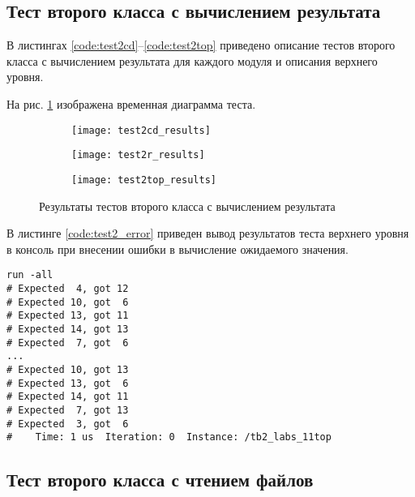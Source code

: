 \subsection{Тест второго класса с вычислением результата}

В листингах \ref{code:test2cd}--\ref{code:test2top} приведено описание тестов второго класса с вычислением результата для каждого модуля и описания верхнего уровня.




На рис. \ref{fig:test2_results} изображена временная диаграмма теста.
\begin{figure}[H]
	\begin{subfigure}{\textwidth}
		\centering
		\texttt{[image: test2cd\_results]}
		\vspace{0.1cm}
	\end{subfigure}
	\begin{subfigure}{\textwidth}
		\centering
		\texttt{[image: test2r\_results]}
		\vspace{0.1cm}
	\end{subfigure}
	\begin{subfigure}{\textwidth}
		\centering
		\texttt{[image: test2top\_results]}
	\end{subfigure}
	\caption{Результаты тестов второго класса с вычислением результата}
	\label{fig:test2_results}
\end{figure}

В листинге \ref{code:test2_error} приведен вывод результатов теста верхнего уровня в консоль при внесении ошибки в вычисление ожидаемого значения.	
\begin{lstlisting}[caption=Результаты ошибочного теста второго класса с вычислением результата, label=code:test2_error, style=console]
run -all
# Expected  4, got 12
# Expected 10, got  6
# Expected 13, got 11
# Expected 14, got 13
# Expected  7, got  6
...
# Expected 10, got 13
# Expected 13, got  6
# Expected 14, got 11
# Expected  7, got 13
# Expected  3, got  6
#    Time: 1 us  Iteration: 0  Instance: /tb2_labs_11top
\end{lstlisting}

\subsection{Тест второго класса с чтением файлов}

